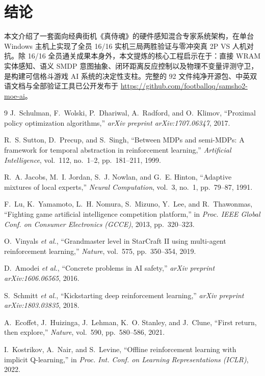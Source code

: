 \documentclass[10pt,twocolumn]{article}
\begin{document}
\section{结论}
本文介绍了一套面向经典街机《真侍魂》的硬件感知混合专家系统架构，在单台 Windows 主机上实现了全员 16/16 实机三局两胜验证与零冲突真 2P VS 人机对抗。除 16/16 全员通关成果本身外，本文提炼的核心工程启示在于：直接 WRAM 实体感知、语义 SMDP 意图抽象、闭环距离反应控制以及物理不变量评测守卫，是构建可信格斗游戏 AI 系统的决定性支柱。完整的 92 文件纯净开源包、中英双语文档与全部验证工具已公开发布于 \url{https://github.com/footballqq/samsho2-moe-ai}。

\begin{thebibliography}{9}
J.~Schulman, F.~Wolski, P.~Dhariwal, A.~Radford, and O.~Klimov, ``Proximal policy optimization algorithms,'' \textit{arXiv preprint arXiv:1707.06347}, 2017.

R.~S. Sutton, D.~Precup, and S.~Singh, ``Between MDPs and semi-MDPs: A framework for temporal abstraction in reinforcement learning,'' \textit{Artificial Intelligence}, vol.~112, no.~1--2, pp.~181--211, 1999.

R.~A. Jacobs, M.~I. Jordan, S.~J. Nowlan, and G.~E. Hinton, ``Adaptive mixtures of local experts,'' \textit{Neural Computation}, vol.~3, no.~1, pp.~79--87, 1991.

F.~Lu, K.~Yamamoto, L.~H. Nomura, S.~Mizuno, Y.~Lee, and R.~Thawonmas, ``Fighting game artificial intelligence competition platform,'' in \textit{Proc. IEEE Global Conf. on Consumer Electronics (GCCE)}, 2013, pp.~320--323.

O.~Vinyals \textit{et al.}, ``Grandmaster level in StarCraft II using multi-agent reinforcement learning,'' \textit{Nature}, vol.~575, pp.~350--354, 2019.

D.~Amodei \textit{et al.}, ``Concrete problems in AI safety,'' \textit{arXiv preprint arXiv:1606.06565}, 2016.

S.~Schmitt \textit{et al.}, ``Kickstarting deep reinforcement learning,'' \textit{arXiv preprint arXiv:1803.03835}, 2018.

A.~Ecoffet, J.~Huizinga, J.~Lehman, K.~O. Stanley, and J.~Clune, ``First return, then explore,'' \textit{Nature}, vol.~590, pp.~580--586, 2021.

I.~Kostrikov, A.~Nair, and S.~Levine, ``Offline reinforcement learning with implicit Q-learning,'' in \textit{Proc. Int. Conf. on Learning Representations (ICLR)}, 2022.
\end{thebibliography}
\end{document}
